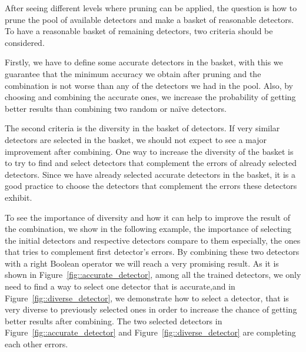 After seeing different levels where pruning can be applied, the question is how to prune the pool of available detectors and make a basket of reasonable detectors. To have a reasonable basket of remaining detectors, two criteria should be considered.  

Firstly, we have to define some accurate detectors in the basket, with this we guarantee that the minimum accuracy we obtain after pruning and the combination is not worse than any of the detectors we had in the pool. Also, by choosing and combining the accurate ones, we increase the probability of getting better results than combining two random or naïve detectors.  

The second criteria is the diversity in the basket of detectors. If very similar detectors  are selected  in the basket, we should not expect to see a major improvement after combining. One way to increase the diversity of the basket is to try to find and select detectors that complement the errors of already selected detectors. Since we have already selected accurate detectors in the basket, it is a good practice to choose the detectors that complement the errors these detectors exhibit. 

To see the importance of diversity and how it can help to improve the result of the combination, we show in the following example, the importance of selecting the initial detectors and respective detectors compare to them especially, the ones that tries to complement first detector's errors. By combining these two detectors with a right Boolean operator we will reach a very promising result. As it is shown in Figure~\ref{fig::accurate_detector}, among all the trained detectors, we only need to find a way to select one detector that is accurate,and in Figure~\ref{fig::diverse_detector}, we demonstrate how to select a detector, that is very diverse to previously selected ones in order to increase the chance of getting better results after combining. The two selected detectors in Figure~\ref{fig::accurate_detector} and Figure~\ref{fig::diverse_detector} are completing each other errors.


